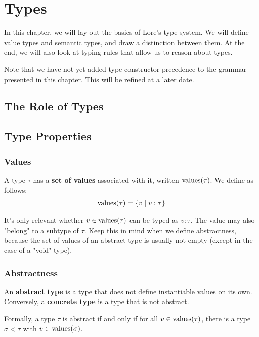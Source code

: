 \chapter{Types}

In this chapter, we will lay out the basics of Lore's type system. We will define value types and semantic types, and draw a distinction between them. At the end, we will also look at typing rules that allow us to reason about types.

Note that we have not yet added type constructor precedence to the grammar presented in this chapter. This will be refined at a later date. 



\section{The Role of Types}



\section{Type Properties}

\subsection{Values}
A type $\tau$ has a \textbf{set of values} associated with it, written $\operatorname{values}(\tau)$. We define as follows:
\begin{align*}
	\operatorname{values}(\tau) = \{ v \mid v : \tau \}
\end{align*}

\noindent It's only relevant whether $v \in \operatorname{values}(\tau)$ can be typed as $v : \tau$. The value may also "belong" to a subtype of $\tau$. Keep this in mind when we define abstractness, because the set of values of an abstract type is usually not empty (except in the case of a "void" type).


\subsection{Abstractness}
An \textbf{abstract type} is a type that does not define instantiable values on its own. Conversely, a \textbf{concrete type} is a type that is not abstract.

Formally, a type $\tau$ is abstract if and only if for all $v \in \operatorname{values}(\tau)$, there is a type $\sigma < \tau$ with $v \in \operatorname{values}(\sigma)$.

